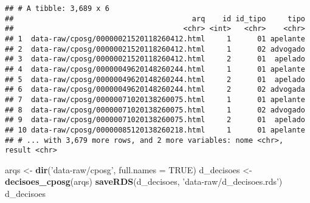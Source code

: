 \documentclass[]{book}
\newenvironment{Shaded}{\begin{snugshade}}{\end{snugshade}}
\newcommand{\KeywordTok}[1]{\textcolor[rgb]{0.13,0.29,0.53}{\textbf{{#1}}}}
\newcommand{\DataTypeTok}[1]{\textcolor[rgb]{0.13,0.29,0.53}{{#1}}}
\newcommand{\StringTok}[1]{\textcolor[rgb]{0.31,0.60,0.02}{{#1}}}
\newcommand{\OtherTok}[1]{\textcolor[rgb]{0.56,0.35,0.01}{{#1}}}
\newcommand{\NormalTok}[1]{{#1}}
\begin{document}
\begin{verbatim}
## # A tibble: 3,689 x 6
##                                         arq    id id_tipo     tipo
##                                       <chr> <int>   <chr>    <chr>
## 1  data-raw/cposg/00000021520118260412.html     1      01 apelante
## 2  data-raw/cposg/00000021520118260412.html     1      02 advogado
## 3  data-raw/cposg/00000021520118260412.html     2      01  apelado
## 4  data-raw/cposg/00000049620148260244.html     1      01 apelante
## 5  data-raw/cposg/00000049620148260244.html     2      01  apelado
## 6  data-raw/cposg/00000049620148260244.html     2      02 advogada
## 7  data-raw/cposg/00000071020138260075.html     1      01 apelante
## 8  data-raw/cposg/00000071020138260075.html     1      02 advogado
## 9  data-raw/cposg/00000071020138260075.html     2      01  apelado
## 10 data-raw/cposg/00000085120138260218.html     1      01 apelante
## # ... with 3,679 more rows, and 2 more variables: nome <chr>, result <chr>
\end{verbatim}

\begin{Shaded}
\end{Shaded}

\begin{Shaded}
\begin{Highlighting}[]
\NormalTok{arqs <-}\StringTok{ }\KeywordTok{dir}\NormalTok{(}\StringTok{'data-raw/cposg'}\NormalTok{, }\DataTypeTok{full.names =} \OtherTok{TRUE}\NormalTok{)}
\NormalTok{d_decisoes <-}\StringTok{ }\KeywordTok{decisoes_cposg}\NormalTok{(arqs)}
\KeywordTok{saveRDS}\NormalTok{(d_decisoes, }\StringTok{'data-raw/d_decisoes.rds'}\NormalTok{)}
\NormalTok{d_decisoes}
\end{Highlighting}
\end{Shaded}
\end{document}
